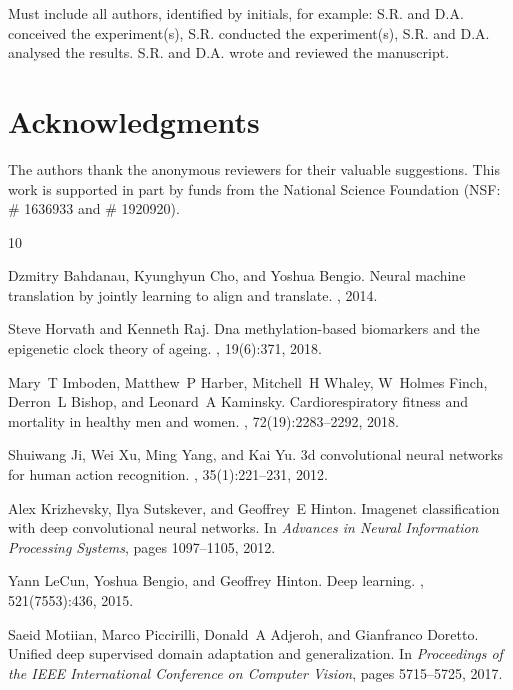 \documentclass[unnumsec,webpdf,contemporary,large]{oup-authoring-template}%
\theoremstyle{thmstyleone}%
\theoremstyle{thmstyletwo}%
\theoremstyle{thmstylethree}%
\begin{document}
Must include all authors, identified by initials, for example:
S.R. and D.A. conceived the experiment(s),  S.R. conducted the experiment(s), S.R. and D.A. analysed the results.  S.R. and D.A. wrote and reviewed the manuscript.

\section{Acknowledgments}
The authors thank the anonymous reviewers for their valuable suggestions. This work is supported in part by funds from the National Science Foundation (NSF: \# 1636933 and \# 1920920).


\begin{thebibliography}{10}

Dzmitry Bahdanau, Kyunghyun Cho, and Yoshua Bengio.
\newblock Neural machine translation by jointly learning to align and translate.
, 2014.

Steve Horvath and Kenneth Raj.
\newblock Dna methylation-based biomarkers and the epigenetic clock theory of ageing.
, 19(6):371, 2018.

Mary~T Imboden, Matthew~P Harber, Mitchell~H Whaley, W~Holmes Finch, Derron~L Bishop, and Leonard~A Kaminsky.
\newblock Cardiorespiratory fitness and mortality in healthy men and women.
, 72(19):2283--2292, 2018.

Shuiwang Ji, Wei Xu, Ming Yang, and Kai Yu.
\newblock 3d convolutional neural networks for human action recognition.
, 35(1):221--231, 2012.

Alex Krizhevsky, Ilya Sutskever, and Geoffrey~E Hinton.
\newblock Imagenet classification with deep convolutional neural networks.
\newblock In {\em Advances in Neural Information Processing Systems}, pages 1097--1105, 2012.

Yann LeCun, Yoshua Bengio, and Geoffrey Hinton.
\newblock Deep learning.
, 521(7553):436, 2015.

Saeid Motiian, Marco Piccirilli, Donald~A Adjeroh, and Gianfranco Doretto.
\newblock Unified deep supervised domain adaptation and generalization.
\newblock In {\em Proceedings of the IEEE International Conference on Computer Vision}, pages 5715--5725, 2017.


\end{thebibliography}
\end{document}
